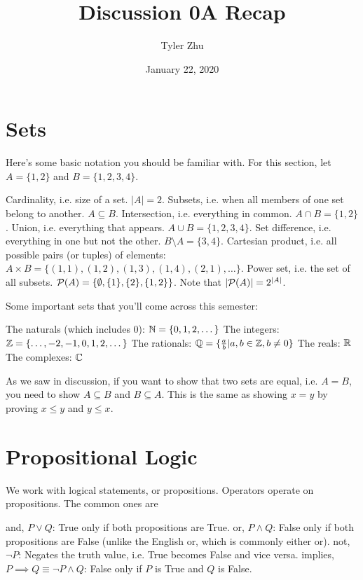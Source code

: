 \documentclass[11 pt]{scrartcl}
\newcommand{\hwtitle}{Discussion 0A Recap}
\begin{document}
 
\title{\Large \hwtitle{}}
\author{\large Tyler Zhu}
\date{January 22, 2020}

\maketitle 

\section{Sets}
Here's some basic notation you should be familiar with. For this section, let $A = \{1,2\}$ and $B = \{1,2,3,4\}$. 
\begin{itemize}
    \ii Cardinality, i.e. size of a set. $|A| = 2$. 
    \ii Subsets, i.e. when all members of one set belong to another. $A\subseteq B$. 
    \ii Intersection, i.e. everything in common. $A \cap B = \{1,2\}$. 
    \ii Union, i.e. everything that appears. $A \cup B = \{1,2,3,4\}$. 
    \ii Set difference, i.e. everything in one but not the other. $B\setminus A = \{3,4\}$. 
    \ii Cartesian product, i.e. all possible pairs (or tuples) of elements: \\$A\times B = \{(1,1), (1,2), (1,3), (1,4), (2,1), \dots \}$. 
    \ii Power set, i.e. the set of all subsets. $\mathcal P(A) = \{\emptyset, \{1\}, \{2\}, \{1,2\}\}$. Note that $|\mathcal P(A)| = 2^{|A|}$.  
\end{itemize}

Some important sets that you'll come across this semester: 
\begin{itemize}
    \ii The naturals (which includes 0): $\mathbb N = \{0,1,2,\dots \}$ 
    \ii The integers: $\mathbb Z = \{\dots, -2, -1, 0, 1, 2, \dots\}$
    \ii The rationals: $\mathbb Q = \{\frac{a}{b} | a,b\in\mathbb Z, b\not= 0\}$
    \ii The reals: $\mathbb R$
    \ii The complexes: $\mathbb C$
\end{itemize}

As we saw in discussion, if you want to show that two sets are equal, i.e. $A = B$, you need to show $A \subseteq B$ and $B\subseteq A$. This is the same as showing $x=y$ by proving $x\leq y$ and $y\leq x$. 

\section{Propositional Logic}
We work with logical statements, or propositions. Operators operate on propositions. The common ones are
\begin{itemize}
    \ii and, $P\vee Q$: True only if both propositions are True. 
    \ii or, $P\wedge Q$: False only if both propositions are False (unlike the English or, which is commonly either or). 
    \ii not, $\neg P$: Negates the truth value, i.e. True becomes False and vice versa. 
    \ii implies, $P\implies Q \equiv \neg P \wedge Q$: False only if $P$ is True and $Q$ is False. 
\end{itemize}
\end{document}
